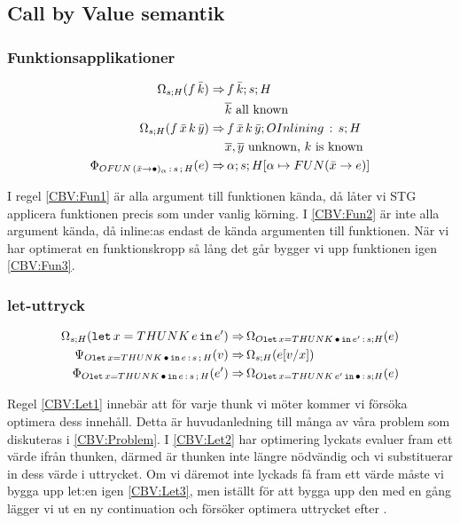 \documentclass[../Optimise]{subfiles}
\begin{document}

\subsection{Call by Value semantik}

\subsubsection{Funktionsapplikationer}

\begin{align}
\label{CBV:Fun1} \Omega_{s;H}(f\,\bar{k})  \Rightarrow &\, f\,\bar{k};s;H\\
 & \overline{k} \text{ all known} \nonumber \\
\label{CBV:Fun2} \Omega_{s;H}(f\,\bar{x}\, k\,\bar{y})  \Rightarrow &\, f\,\bar{x}\, k\,\bar{y};OInlining\,:\,s;H\\
 & \overline{x},\overline{y} \text{ unknown, } k \text{ is known} \nonumber \\
\label{CBV:Fun3} \Phi_{OFUN\,(\bar{x}\to\bullet)_{\alpha}\,:\,s\,;\,H}(e)  \Rightarrow &\, \alpha;s;H[\alpha\mapsto FUN(\bar{x}\to e)]
\end{align}

I regel \eqref{CBV:Fun1} är alla argument till funktionen kända, då låter vi STG applicera funktionen precis som under vanlig körning. I \eqref{CBV:Fun2} är inte
alla argument kända, då inline:as endast de kända argumenten till funktionen. 
När vi har optimerat en funktionskropp så lång det går bygger vi upp funktionen igen \eqref{CBV:Fun3}.


\subsubsection{let-uttryck}

\begin{align}
\label{CBV:Let1} \Omega_{s;H}(\mathtt{let}\,x=THUNK\,e\,\mathtt{in}\,e')  \Rightarrow &\, \Omega_{O\mathtt{let\,}x=THUNK\,\bullet\,\mathtt{in}\,e'\,:\,s;H}(e)\\
\label{CBV:Let2} \Psi_{O\mathtt{let\,}x=THUNK\,\bullet\,\mathtt{in}\,e\,:\,s\,;\,H}(v)  \Rightarrow &\, \Omega_{s;H}(e[v/x]) \\
\label{CBV:Let3} \Phi_{O\mathtt{let\,}x=THUNK\,\bullet\,\mathtt{in}\,e\,:\,s\,;\,H}(e')  \Rightarrow &\, \Omega_{O\mathtt{let\,}x=THUNK\,e'\,\mathtt{in}\,\bullet\,:\,s;H}(e)
\end{align}

Regel \eqref{CBV:Let1} innebär att för varje thunk vi möter kommer vi försöka optimera
dess innehåll. Detta är huvudanledning till många av våra problem som diskuteras i \ref{CBV:Problem}.
I \eqref{CBV:Let2} har optimering lyckats evaluer fram ett värde ifrån thunken, därmed är thunken inte längre nödvändig och vi substituerar in dess värde i uttrycket. Om vi däremot inte lyckads få fram ett värde måste vi bygga upp let:en igen \eqref{CBV:Let3}, men iställt för att bygga upp den med en gång lägger vi ut en ny continuation och försöker optimera uttrycket efter .
\end{document}
